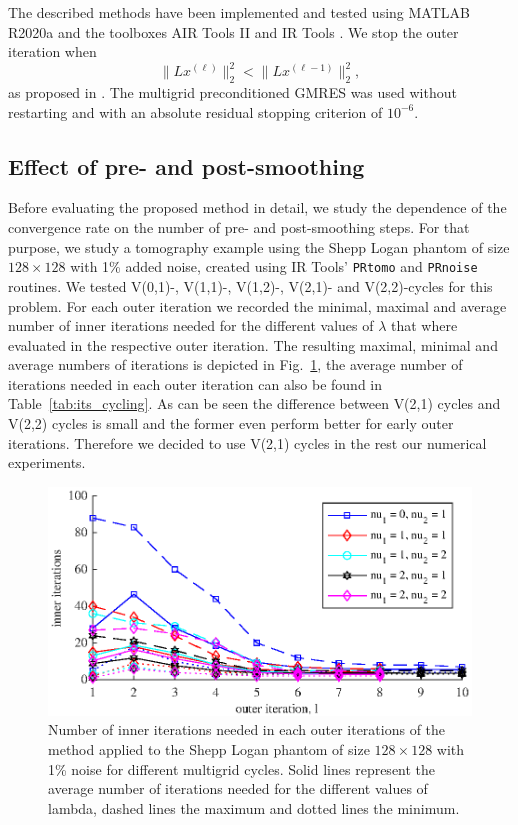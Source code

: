 The described methods have been implemented and tested using MATLAB R2020a and the toolboxes AIR Tools II \cite{art:HANS18} and IR Tools \cite{art:GAZZ19}. We stop the outer iteration when
\[
\|L x^{(\ell)}\|_2^2 < \|L x^{(\ell-1)}\|_2^2,
\]
as proposed in \cite{Gazzola_etal_2020}. The multigrid preconditioned GMRES was used without restarting and with an absolute residual stopping criterion of $10^{-6}$.

\subsection{Effect of pre- and post-smoothing}
Before evaluating the proposed method in detail, we study the dependence of the convergence rate on the number of pre- and post-smoothing steps. For that purpose, we study a tomography example using the Shepp Logan phantom of size $128 \times 128$ with 1\% added noise, created using IR Tools' \cite{art:GAZZ19} \texttt{PRtomo} and \texttt{PRnoise} routines. We tested V(0,1)-, V(1,1)-, V(1,2)-, V(2,1)- and V(2,2)-cycles for this problem. For each outer iteration we recorded the minimal, maximal and average number of inner iterations needed for the different values of $\lambda$ that where evaluated in the respective outer iteration. The resulting maximal, minimal and average numbers of iterations is depicted in Fig.~\ref{fig:its_cycling}, the average number of iterations needed in each outer iteration can also be found in Table~\ref{tab:its_cycling}. As can be seen the difference between V(2,1) cycles and V(2,2) cycles is small and the former even perform better for early outer iterations. Therefore we decided to use V(2,1) cycles in the rest our numerical experiments.
\begin{figure}[htbp]
\begin{center}
\includegraphics{figures/its_cycling}
\caption{Number of inner iterations needed in each outer iterations of the method applied to the Shepp Logan phantom of size $128 \times 128$ with 1\% noise for different multigrid cycles. Solid lines represent the average number of iterations needed for the different values of lambda, dashed lines the maximum and dotted lines the minimum.}
\label{fig:its_cycling}
\end{center}
\end{figure}
